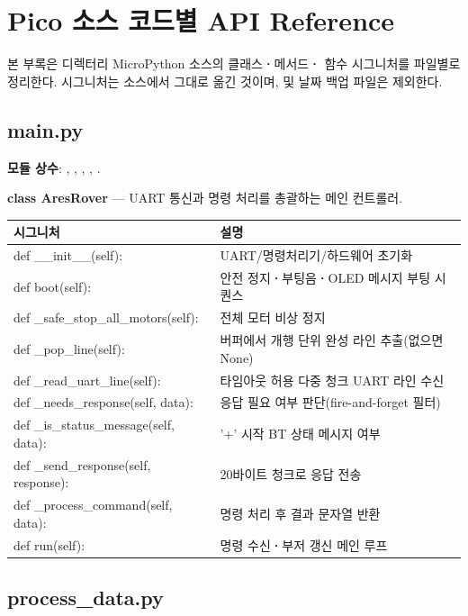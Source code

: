 \section{Pico 소스 코드별 API Reference}

본 부록은  디렉터리 MicroPython 소스의 클래스\textbf{·}메서드\textbf{·}
함수 시그니처를 파일별로 정리한다. 시그니처는 소스에서 그대로 옮긴 것이며,
 및 날짜 백업 파일은 제외한다.

\subsection{main.py}

\noindent\textbf{모듈 상수}: , ,
, ,
.

\noindent\textbf{class AresRover} --- UART 통신과 명령 처리를 총괄하는 메인 컨트롤러.

\begin{longtable}{S{7.4cm} L{6.6cm}}
\toprule
{}\normalfont\sffamily\bfseries 시그니처 & \normalfont\sffamily\bfseries 설명 \\
\midrule
\endhead
def \_\_init\_\_(self): & UART/명령처리기/하드웨어 초기화 \\
def boot(self): & 안전 정지\textbf{·}부팅음\textbf{·}OLED 메시지 부팅 시퀀스 \\
def \_safe\_stop\_all\_motors(self): & 전체 모터 비상 정지 \\
def \_pop\_line(self): & 버퍼에서 개행 단위 완성 라인 추출(없으면 None) \\
def \_read\_uart\_line(self): & 타임아웃 허용 다중 청크 UART 라인 수신 \\
def \_needs\_response(self, data): & 응답 필요 여부 판단(fire-and-forget 필터) \\
def \_is\_status\_message(self, data): & '+' 시작 BT 상태 메시지 여부 \\
def \_send\_response(self, response): & 20바이트 청크로 응답 전송 \\
def \_process\_command(self, data): & 명령 처리 후 결과 문자열 반환 \\
def run(self): & 명령 수신\textbf{·}부저 갱신 메인 루프 \\
\bottomrule
\end{longtable}

\subsection{process\_data.py}

